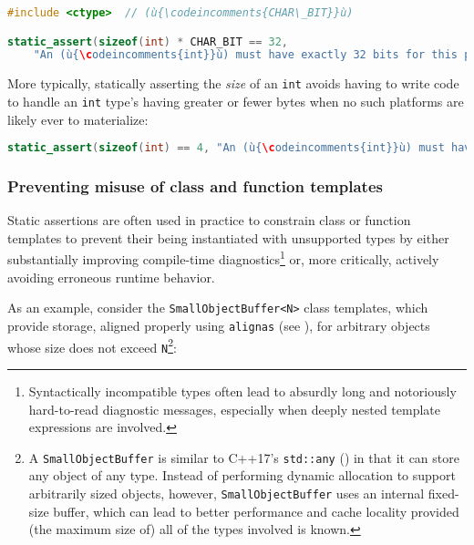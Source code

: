 \begin{lstlisting}[language=C++]
#include <ctype>  // (ù{\codeincomments{CHAR\_BIT}}ù)

static_assert(sizeof(int) * CHAR_BIT == 32,
    "An (ù{\codeincomments{int}}ù) must have exactly 32 bits for this program to work correctly.");
\end{lstlisting}
    
\noindent More typically, statically asserting the \emph{size} of an \lstinline!int!
avoids having to write code to handle an \lstinline!int! type's having
greater or fewer bytes when no such platforms are likely ever to
materialize:

\begin{lstlisting}[language=C++]
static_assert(sizeof(int) == 4, "An (ù{\codeincomments{int}}ù) must have exactly 4 bytes.");
\end{lstlisting}
    

\subsubsection[Preventing misuse of class and function templates]{Preventing misuse of class and function templates}\label{preventing-misuse-of-class-and-function-templates}

Static assertions are often used in practice to constrain class or
function templates to prevent their being instantiated with unsupported
types by either substantially improving compile-time
diagnostics{\cprotect\footnote{Syntactically incompatible types often
lead to absurdly long and notoriously hard-to-read diagnostic messages, especially when deeply nested template expressions are involved.}} or, more critically, actively avoiding
erroneous runtime behavior.

As an example, consider the \lstinline!SmallObjectBuffer<N>! class
templates, which provide storage, aligned properly using \lstinline!alignas! (see 
), 
for arbitrary objects whose size does
not exceed \lstinline!N!{\cprotect\footnote{A \lstinline!SmallObjectBuffer! is
  similar to C++17's \lstinline!std::any! (\cite{cpprefstdany}) in
  that it can store any object of any type. Instead of performing
  dynamic allocation to support arbitrarily sized objects, however,
  \lstinline!SmallObjectBuffer! uses an internal fixed-size buffer, which
  can lead to better performance and cache locality provided (the
  maximum size of) all of the types involved is known.}}:

